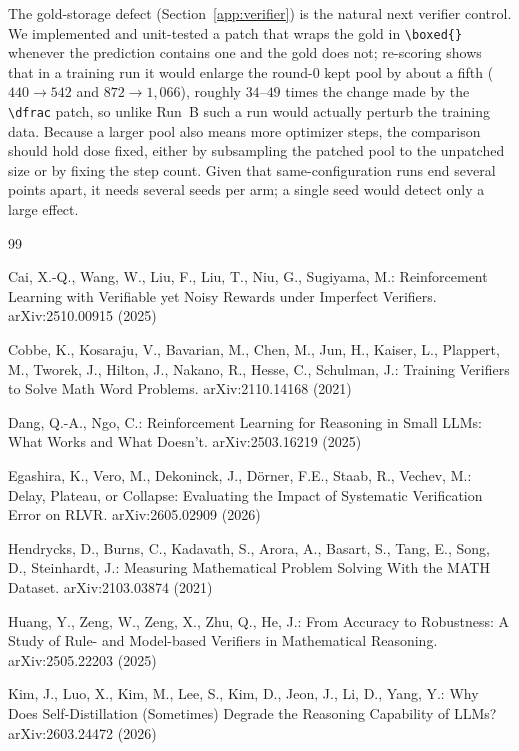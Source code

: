 \documentclass[runningheads]{llncs}
\begin{document}
The gold-storage defect (Section~\ref{app:verifier}) is the natural next
verifier control. We implemented and unit-tested a patch that wraps the gold in
\verb|\boxed{}| whenever the prediction contains one and the gold does not;
re-scoring shows that in a training run it would enlarge the round-0 kept pool
by about a fifth ($440\to542$ and $872\to1{,}066$), roughly $34$--$49$ times the
change made by the \verb|\dfrac| patch, so unlike Run~B such a run would
actually perturb the training data. Because a larger pool also means more
optimizer steps, the comparison should hold dose fixed, either by subsampling
the patched pool to the unpatched size or by fixing the step count. Given that
same-configuration runs end several points apart, it needs several seeds per
arm; a single seed would detect only a large effect.


\begin{thebibliography}{99}

Cai, X.-Q., Wang, W., Liu, F., Liu, T., Niu, G., Sugiyama, M.:
Reinforcement Learning with Verifiable yet Noisy Rewards under Imperfect
Verifiers. arXiv:2510.00915 (2025)

Cobbe, K., Kosaraju, V., Bavarian, M., Chen, M., Jun, H., Kaiser, L.,
Plappert, M., Tworek, J., Hilton, J., Nakano, R., Hesse, C., Schulman, J.:
Training Verifiers to Solve Math Word Problems. arXiv:2110.14168 (2021)

Dang, Q.-A., Ngo, C.: Reinforcement Learning for Reasoning in Small LLMs: What
Works and What Doesn't. arXiv:2503.16219 (2025)

Egashira, K., Vero, M., Dekoninck, J., D\"orner, F.E., Staab, R., Vechev,
M.: Delay, Plateau, or Collapse: Evaluating the Impact of Systematic
Verification Error on RLVR. arXiv:2605.02909 (2026)

Hendrycks, D., Burns, C., Kadavath, S., Arora, A., Basart, S., Tang, E.,
Song, D., Steinhardt, J.: Measuring Mathematical Problem Solving With the
MATH Dataset. arXiv:2103.03874 (2021)

Huang, Y., Zeng, W., Zeng, X., Zhu, Q., He, J.: From Accuracy to
Robustness: A Study of Rule- and Model-based Verifiers in Mathematical
Reasoning. arXiv:2505.22203 (2025)

Kim, J., Luo, X., Kim, M., Lee, S., Kim, D., Jeon, J., Li, D., Yang, Y.:
Why Does Self-Distillation (Sometimes) Degrade the Reasoning Capability of
LLMs? arXiv:2603.24472 (2026)


\end{thebibliography}
\end{document}
